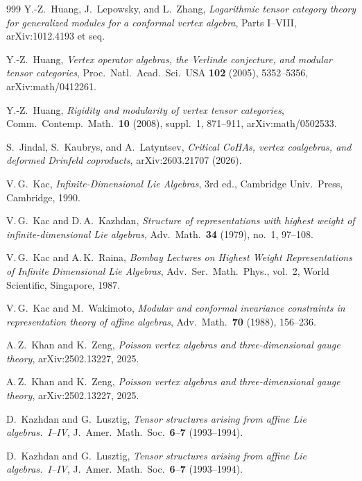\documentclass[11pt]{memoir}
\begin{document}
\begin{thebibliography}{999}
Y.-Z.~Huang, J.~Lepowsky, and L.~Zhang, \emph{Logarithmic tensor category theory for generalized modules for a conformal vertex algebra}, Parts I--VIII, arXiv:1012.4193 et seq.

Y.-Z.~Huang, \emph{Vertex operator algebras, the Verlinde conjecture, and modular tensor categories}, Proc.\ Natl.\ Acad.\ Sci.\ USA \textbf{102} (2005), 5352--5356, arXiv:math/0412261.

Y.-Z.~Huang, \emph{Rigidity and modularity of vertex tensor categories}, Comm.\ Contemp.\ Math.\ \textbf{10} (2008), suppl.~1, 871--911, arXiv:math/0502533.

S.~Jindal, S.~Kaubrys, and A.~Latyntsev, \emph{Critical CoHAs, vertex coalgebras, and deformed Drinfeld coproducts}, arXiv:2603.21707 (2026).

V.\,G.~Kac, \emph{Infinite-Dimensional Lie Algebras}, 3rd ed., Cambridge Univ.\ Press, Cambridge, 1990.

V.\,G.~Kac and D.\,A.~Kazhdan, \emph{Structure of representations with highest weight of infinite-dimensional Lie algebras}, Adv.\ Math.\ \textbf{34} (1979), no.~1, 97--108.

V.\,G.~Kac and A.\,K.~Raina, \emph{Bombay Lectures on Highest Weight Representations of Infinite Dimensional Lie Algebras}, Adv.\ Ser.\ Math.\ Phys., vol.~2, World Scientific, Singapore, 1987.

V.\,G.~Kac and M.~Wakimoto, \emph{Modular and conformal invariance constraints in representation theory of affine algebras}, Adv.\ Math.\ \textbf{70} (1988), 156--236.

A.\,Z.~Khan and K.~Zeng, \emph{Poisson vertex algebras and three-dimensional gauge theory}, arXiv:2502.13227, 2025.

A.\,Z.~Khan and K.~Zeng, \emph{Poisson vertex algebras and three-dimensional gauge theory}, arXiv:2502.13227, 2025.

D.~Kazhdan and G.~Lusztig, \emph{Tensor structures arising from affine Lie algebras.~I--IV}, J.~Amer.\ Math.\ Soc.\ \textbf{6}--\textbf{7} (1993--1994).

D.~Kazhdan and G.~Lusztig, \emph{Tensor structures arising from affine Lie algebras.~I--IV}, J.~Amer.\ Math.\ Soc.\ \textbf{6}--\textbf{7} (1993--1994).


\end{thebibliography}
\end{document}
